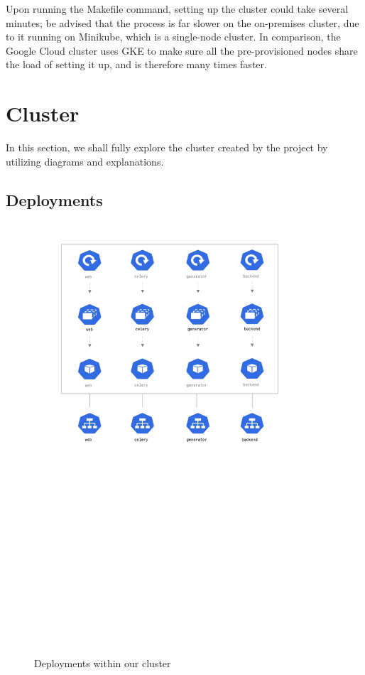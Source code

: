 \documentclass[thesis=B,english]{FITthesis}[2019/12/23]
\begin{document}
Upon running the Makefile command, setting up the cluster could take several minutes; be advised that the process is far slower on the on-premises cluster, due to it running on Minikube, which is a single-node cluster. In comparison, the Google Cloud cluster uses GKE to make sure all the pre-provisioned nodes share the load of setting it up, and is therefore many times faster.

\section{Cluster}

In this section, we shall fully explore the cluster created by the project by utilizing diagrams and explanations. 

\subsection{Deployments}

\begin{figure}[H]
\centering
\caption{Deployments within our cluster}
\hspace*{-2cm}
\includegraphics[scale=0.5]{deployment-diagram}
\end{figure}
\end{document}
